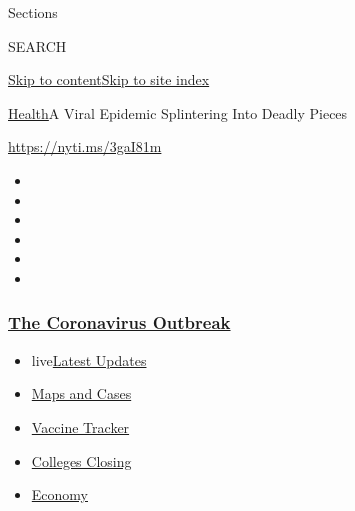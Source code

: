 Sections

SEARCH

\protect\hyperlink{site-content}{Skip to
content}\protect\hyperlink{site-index}{Skip to site index}

\href{/section/health}{Health}\textbar{}A Viral Epidemic Splintering
Into Deadly Pieces

\url{https://nyti.ms/3gaI81m}

\begin{itemize}
\item
\item
\item
\item
\item
\item
\end{itemize}

\hypertarget{the-coronavirus-outbreak}{%
\subsubsection{\texorpdfstring{\href{https://www.nytimes3xbfgragh.onion/news-event/coronavirus?name=styln-coronavirus-national\&region=TOP_BANNER\&variant=undefined\&block=storyline_menu_recirc\&action=click\&pgtype=Article\&impression_id=740a6c10-e38f-11ea-8b19-dfa06b4ffac1}{The
Coronavirus
Outbreak}}{The Coronavirus Outbreak}}\label{the-coronavirus-outbreak}}

\begin{itemize}
\tightlist
\item
  live\href{https://www.nytimes3xbfgragh.onion/2020/08/20/world/coronavirus-covid.html?name=styln-coronavirus-national\&region=TOP_BANNER\&variant=undefined\&block=storyline_menu_recirc\&action=click\&pgtype=Article\&impression_id=740a6c11-e38f-11ea-8b19-dfa06b4ffac1}{Latest
  Updates}
\item
  \href{https://www.nytimes3xbfgragh.onion/interactive/2020/us/coronavirus-us-cases.html?name=styln-coronavirus-national\&region=TOP_BANNER\&variant=undefined\&block=storyline_menu_recirc\&action=click\&pgtype=Article\&impression_id=740a6c12-e38f-11ea-8b19-dfa06b4ffac1}{Maps
  and Cases}
\item
  \href{https://www.nytimes3xbfgragh.onion/interactive/2020/science/coronavirus-vaccine-tracker.html?name=styln-coronavirus-national\&region=TOP_BANNER\&variant=undefined\&block=storyline_menu_recirc\&action=click\&pgtype=Article\&impression_id=740a6c13-e38f-11ea-8b19-dfa06b4ffac1}{Vaccine
  Tracker}
\item
  \href{https://www.nytimes3xbfgragh.onion/2020/08/19/us/colleges-closing-covid.html?name=styln-coronavirus-national\&region=TOP_BANNER\&variant=undefined\&block=storyline_menu_recirc\&action=click\&pgtype=Article\&impression_id=740a6c14-e38f-11ea-8b19-dfa06b4ffac1}{Colleges
  Closing}
\item
  \href{https://www.nytimes3xbfgragh.onion/live/2020/08/20/business/stock-market-today-coronavirus?name=styln-coronavirus-national\&region=TOP_BANNER\&variant=undefined\&block=storyline_menu_recirc\&action=click\&pgtype=Article\&impression_id=740a6c15-e38f-11ea-8b19-dfa06b4ffac1}{Economy}
\end{itemize}

